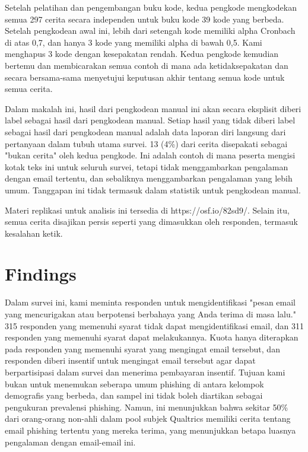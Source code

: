 \documentclass[lettersize,journal]{IEEEtran}
\begin{document}
Setelah pelatihan dan pengembangan buku kode, kedua pengkode mengkodekan semua 297 cerita secara independen untuk buku kode 39 kode yang berbeda. Setelah pengkodean awal ini, lebih dari setengah kode memiliki alpha Cronbach di atas 0,7, dan hanya 3 kode yang memiliki alpha di bawah 0,5. Kami menghapus 3 kode dengan kesepakatan rendah. Kedua pengkode kemudian bertemu dan membicarakan semua contoh di mana ada ketidaksepakatan dan secara bersama-sama menyetujui keputusan akhir tentang semua kode untuk semua cerita.

Dalam makalah ini, hasil dari pengkodean manual ini akan secara eksplisit diberi label sebagai hasil dari pengkodean manual. Setiap hasil yang tidak diberi label sebagai hasil dari pengkodean manual adalah data laporan diri langsung dari pertanyaan dalam tubuh utama survei. 13 (4\%) dari cerita disepakati sebagai "bukan cerita" oleh kedua pengkode. Ini adalah contoh di mana peserta mengisi kotak teks ini untuk seluruh survei, tetapi tidak menggambarkan pengalaman dengan email tertentu, dan sebaliknya menggambarkan pengalaman yang lebih umum. Tanggapan ini tidak termasuk dalam statistik untuk pengkodean manual.

Materi replikasi untuk analisis ini tersedia di https://osf.io/82sd9/. Selain itu, semua cerita disajikan persis seperti yang dimasukkan oleh responden, termasuk kesalahan ketik.

\section{Findings}

Dalam survei ini, kami meminta responden untuk mengidentifikasi "pesan email yang mencurigakan atau berpotensi berbahaya yang Anda terima di masa lalu." 315 responden yang memenuhi syarat tidak dapat mengidentifikasi email, dan 311 responden yang memenuhi syarat dapat melakukannya. Kuota hanya diterapkan pada responden yang memenuhi syarat yang mengingat email tersebut, dan responden diberi insentif untuk mengingat email tersebut agar dapat berpartisipasi dalam survei dan menerima pembayaran insentif. Tujuan kami bukan untuk menemukan seberapa umum phishing di antara kelompok demografis yang berbeda, dan sampel ini tidak boleh diartikan sebagai pengukuran prevalensi phishing. Namun, ini menunjukkan bahwa sekitar 50\% dari orang-orang non-ahli dalam pool subjek Qualtrics memiliki cerita tentang email phishing tertentu yang mereka terima, yang menunjukkan betapa luasnya pengalaman dengan email-email ini.
\end{document}
